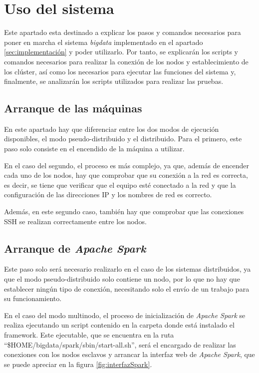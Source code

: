\chapter{Uso del sistema \label{sec:usodelsistema}}
Este apartado esta destinado a explicar los pasos y comandos necesarios para poner en marcha el sistema \textit{bigdata} implementado en el apartado \ref{sec:implementación} y poder utilizarlo. Por tanto, se explicarán los scripts y comandos necesarios para realizar la conexión de los nodos y establecimiento de los clúster, así como los necesarios para ejecutar las funciones del sistema y, finalmente, se analizarán los scripts utilizados para realizar las pruebas.

\section{Arranque de las máquinas}
En este apartado hay que diferenciar entre los dos modos de ejecución disponibles, el modo pseudo-distribuido y el distribuido. Para el primero, este paso solo consiste en el encendido de la máquina a utilizar.

En el caso del segundo, el proceso es más complejo, ya que, además de encender cada uno de los nodos, hay que comprobar que su conexión a la red es correcta, es decir, se tiene que verificar que el equipo esté conectado a la red y que la configuración de las direcciones IP y los nombres de red es correcto.

Además, en este segundo caso, también hay que comprobar que las conexiones \gls{SSH} se realizan correctamente entre los nodos.

\section{Arranque de \textit{Apache Spark} \label{arranqueSpark}}
Este paso solo será necesario realizarlo en el caso de los sistemas distribuidos, ya que el modo pseudo-distribuido solo contiene un nodo, por lo que no hay que establecer ningún tipo de conexión, necesitando solo el envío de un trabajo para su funcionamiento.

En el caso del modo multinodo, el proceso de inicialización de \textit{Apache Spark} se realiza ejecutando un script contenido en la carpeta donde está instalado el \gls{framework}. Este ejecutable, que se encuentra en la ruta ``\$HOME/bigdata/spark/sbin/start-all.sh'', será el encargado de realizar las conexiones con los nodos esclavos y arrancar la interfaz web de \textit{Apache Spark}, que se puede apreciar en la figura \ref{fig:interfazSpark}.

